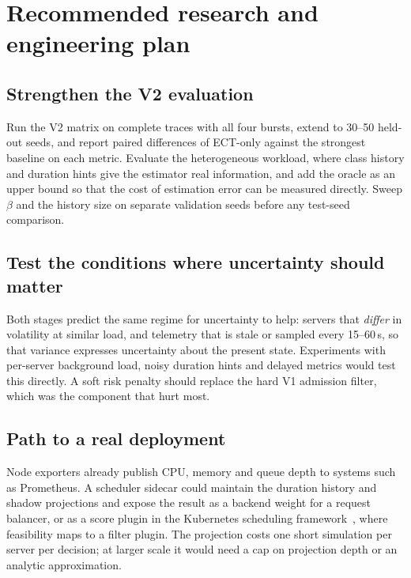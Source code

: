 \documentclass[11pt,a4paper]{article}
\begin{document}
\section{Recommended research and engineering plan}

\subsection{Strengthen the V2 evaluation}
Run the V2 matrix on complete traces with all four bursts, extend to 30--50 held-out seeds, and report paired
differences of ECT-only against the strongest baseline on each metric. Evaluate the heterogeneous workload,
where class history and duration hints give the estimator real information, and add the oracle as an upper
bound so that the cost of estimation error can be measured directly. Sweep $\beta$ and the history size on
separate validation seeds before any test-seed comparison.

\subsection{Test the conditions where uncertainty should matter}
Both stages predict the same regime for uncertainty to help: servers that \emph{differ} in volatility at similar
load, and telemetry that is stale or sampled every 15--60\,s, so that variance expresses uncertainty about the
present state. Experiments with per-server background load, noisy duration hints and delayed metrics would test
this directly. A soft risk penalty should replace the hard V1 admission filter, which was the component that
hurt most.

\subsection{Path to a real deployment}
Node exporters already publish CPU, memory and queue depth to systems such as Prometheus. A scheduler sidecar
could maintain the duration history and shadow projections and expose the result as a backend weight for a
request balancer, or as a score plugin in the Kubernetes scheduling framework~\cite{k8sframework}, where
feasibility maps to a filter plugin. The projection costs one short simulation per server per decision; at
larger scale it would need a cap on projection depth or an analytic approximation.
\end{document}
